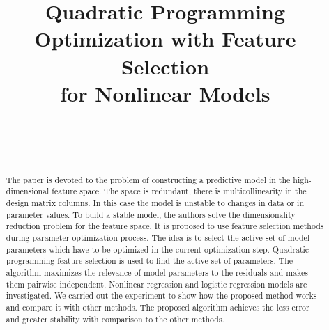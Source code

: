 \documentclass[
11pt,%
tightenlines,%
twoside,%
onecolumn,%
nofloats,%
nobibnotes,%
nofootinbib,%
superscriptaddress,%
noshowpacs,%
centertags]%
{revtex4}
\begin{document}

\title{Quadratic Programming Optimization with Feature Selection \\ for Nonlinear Models}

\author{~}

\author{~}




\begin{abstract} %
	The paper is devoted to the problem of constructing a predictive model in the high-dimensional feature space.
The space is redundant, there is multicollinearity in the design matrix columns.
In this case the model is unstable to changes in data or in parameter values. 
To build a stable model, the authors solve the dimensionality reduction problem for the feature space.
It is proposed to use feature selection methods during parameter optimization process.
The idea is to select the active set of model parameters which have to be optimized in the current optimization step.
Quadratic programming feature selection is used to find the active set of parameters. 
The algorithm maximizes the relevance of model parameters to the residuals and makes them pairwise independent. 
Nonlinear regression and logistic regression models are investigated. 
We carried out the experiment to show how the proposed method works and compare it with other methods. 
The proposed algorithm achieves the less error and greater stability with comparison to the other methods.
\end{abstract}
\end{document}
